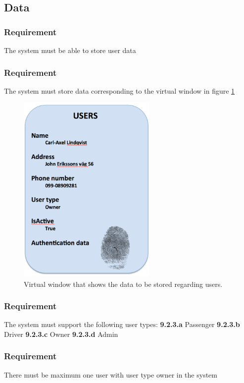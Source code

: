 \documentclass{article}
\begin{document}
{  \subsection{Data}
      \subsubsection{Requirement}
\hfill \break 
\- \- \-The system must be able to store user data
      \subsubsection{Requirement}
\hfill \break 
\- \- \-The system must store data corresponding to the virtual window in figure \ref{vw1}
\begin{figure}[htb]   
 \centering
 \includegraphics[width=0.6\textwidth]
    {VirtualWindow1.png}
  \caption{Virtual window that shows the data to be stored regarding users.}
  \label{vw1}
\end{figure}
\bigskip
      \subsubsection{Requirement}
\hfill \break 
\- \- \-The system must support the following user types:
\hfill \break 
\indent
\textbf{9.2.3.a} Passenger
\hfill \break 
\indent
\textbf{9.2.3.b} Driver
\hfill \break 
\indent
\textbf{9.2.3.c} Owner
\hfill \break 
\indent
\textbf{9.2.3.d} Admin
      \subsubsection{Requirement}
\hfill \break 
\- \- \-There must be maximum one user with user type owner in the system
}
\end{document}
